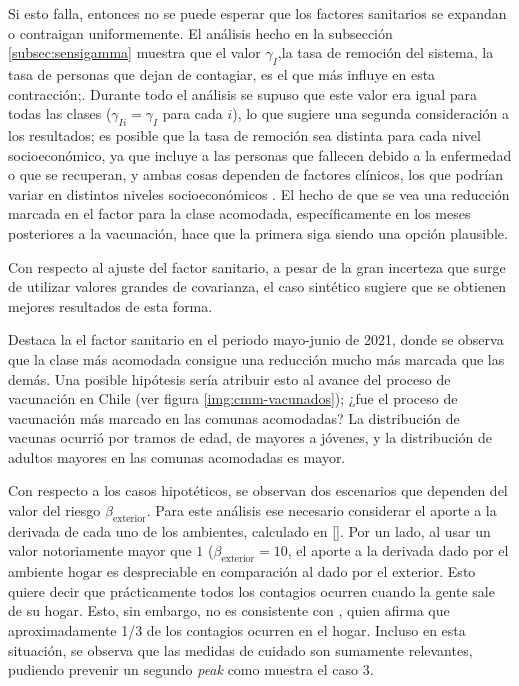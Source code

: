 Si esto falla, entonces no se puede esperar que los factores sanitarios se expandan o contraigan uniformemente. El análisis hecho en la subsección \ref{subsec:sensigamma} muestra que el valor \(\gamma_I\),la tasa de remoción del sistema, la tasa de personas que dejan de contagiar, es el que más influye en esta contracción;. Durante todo el análisis se supuso que este valor era igual para todas las clases (\(\gamma_{Ii} = \gamma_I\) para cada \(i\)), lo que sugiere una segunda consideración a los resultados; es posible que la tasa de remoción sea distinta para cada nivel socioeconómico, ya que incluye a las personas que fallecen debido a la enfermedad o que se recuperan, y ambas cosas dependen de factores clínicos, los que podrían variar en distintos niveles socioeconómicos \cite{Mena2021}. El hecho de que se vea una reducción marcada en el factor para la clase acomodada, específicamente en los meses posteriores a la vacunación, hace que la primera siga siendo una opción plausible.

Con respecto al ajuste del factor sanitario, a pesar de la gran incerteza que surge de utilizar valores grandes de covarianza, el caso sintético sugiere que se obtienen mejores resultados de esta forma.

Destaca la el factor sanitario en el periodo mayo-junio de 2021, donde se observa que la clase más acomodada consigue una reducción mucho más marcada que las demás. Una posible hipótesis sería atribuir esto al avance del proceso de vacunación en Chile (ver figura \ref{img:cmm-vacunados}); ¿fue el proceso de vacunación más marcado en las comunas acomodadas? La distribución de vacunas ocurrió por tramos de edad, de mayores a jóvenes, y la distribución de adultos mayores en las comunas acomodadas es mayor.

Con respecto a los casos hipotéticos, se observan dos escenarios que dependen del valor del riesgo \(\beta_{\text{exterior}}\). Para este análisis ese necesario considerar el aporte a la derivada de cada uno de los ambientes, calculado en \ref{}. 
Por un lado, al usar un valor notoriamente mayor que \(1\) (\(\beta_{\text{exterior}} = 10\), el aporte a la derivada dado por el ambiente \(\text{hogar}\) es despreciable en comparación al dado por el \(\text{exterior}\). Esto quiere decir que prácticamente todos los contagios ocurren cuando la gente sale de su hogar. Esto, sin embargo, no es consistente con \cite{Ferguson2020}, quien afirma que aproximadamente 1/3 de los contagios ocurren en el hogar. Incluso en esta situación, se observa que las medidas de cuidado son sumamente relevantes, pudiendo prevenir un segundo \textit{peak} como muestra el caso 3.

